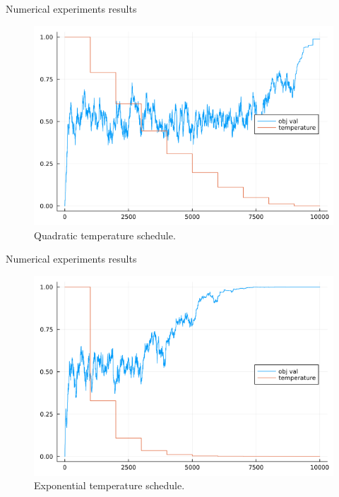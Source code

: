 \documentclass[11pt]{beamer}
\begin{document}
    \begin{frame}{Numerical experiments results}
        \begin{figure}
            \centering
            \includegraphics[scale=0.4]{sa_experiment1.png}
            \caption{Quadratic temperature schedule. }
        \end{figure}
    \end{frame}
    \begin{frame}{Numerical experiments results}
        \begin{figure}
            \centering
            \includegraphics[scale=0.4]{sa_experiment2.png}
            \caption{Exponential temperature schedule. }
        \end{figure}
    \end{frame}
\end{document}
